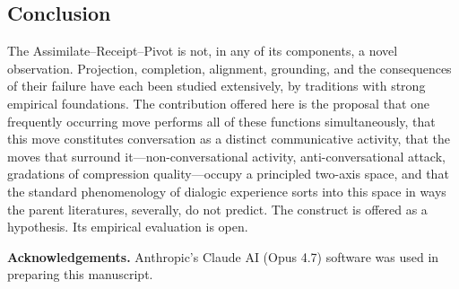 \subsection{Conclusion}

The Assimilate--Receipt--Pivot is not, in any of its components, a novel observation. Projection, completion, alignment, grounding, and the consequences of their failure have each been studied extensively, by traditions with strong empirical foundations. The contribution offered here is the proposal that one frequently occurring move performs all of these functions simultaneously, that this move constitutes conversation as a distinct communicative activity, that the moves that surround it---non-conversational activity, anti-conversational attack, gradations of compression quality---occupy a principled two-axis space, and that the standard phenomenology of dialogic experience sorts into this space in ways the parent literatures, severally, do not predict. The construct is offered as a hypothesis. Its empirical evaluation is open.

\medskip
\noindent\textbf{Acknowledgements.} Anthropic's Claude AI (Opus 4.7) software was used in preparing this manuscript.




